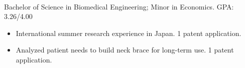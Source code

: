 \documentclass[margin, a4paper]{res}
\begin{document}
\begin{sloppypar}
\begin{resume}




\\
Bachelor of Science in Biomedical Engineering; Minor in Economics. GPA: 3.26/4.00
    \begin{itemize}
    \item International summer research experience in Japan. 1 patent application.

    \item Analyzed patient needs to build neck brace for long-term use. 1 patent application.


\end{itemize}
\end{resume}
\end{sloppypar}
\end{document}
